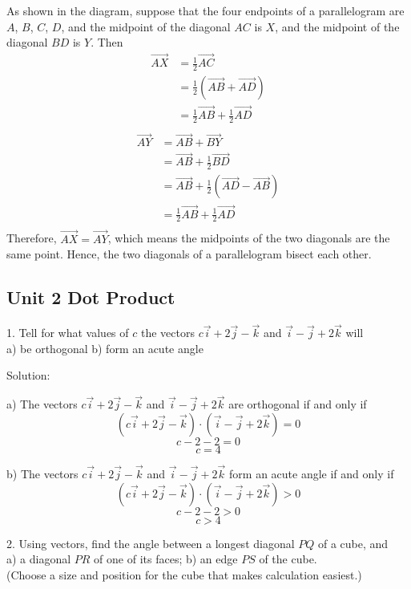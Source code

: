 \documentclass{article}
\begin{document}
As shown in the diagram, suppose that the four endpoints of a parallelogram are 
$A$, $B$, $C$, $D$, and the midpoint of the diagonal $AC$ is $X$, and the 
midpoint of the diagonal $BD$ is $Y$. Then
\[
  \begin{split}
    \vec{AX} &= \frac{1}{2}\vec{AC} \\
             &= \frac{1}{2}(\vec{AB} + \vec{AD}) \\
             &= \frac{1}{2}\vec{AB} + \frac{1}{2}\vec{AD} \\
  \end{split}
\]
\[
  \begin{split}
    \vec{AY} &= \vec{AB} + \vec{BY} \\
             &= \vec{AB} + \frac{1}{2}\vec{BD} \\
             &= \vec{AB} + \frac{1}{2}(\vec{AD} - \vec{AB}) \\
             &= \frac{1}{2}\vec{AB} + \frac{1}{2}\vec{AD} \\
  \end{split}
\]
Therefore, $\vec{AX} = \vec{AY}$, which means the midpoints of the two 
diagonals are the same point. Hence, the two diagonals of a parallelogram 
bisect each other.

\subsection*{Unit 2 Dot Product}

1. Tell for what values of $c$ the vectors $c \vec{i} + 2 \vec{j} - \vec{k}$
and $\vec{i} - \vec{j} + 2 \vec{k}$ will \\
a) be orthogonal \hspace{10px} b) form an acute angle

Solution:

a) The vectors $c \vec{i} + 2 \vec{j} - \vec{k}$ and 
$\vec{i} - \vec{j} + 2 \vec{k}$ are orthogonal if and only if
\[
  (c \vec{i} + 2 \vec{j} - \vec{k}) \cdot (\vec{i} - \vec{j} + 2 \vec{k}) = 0
\]
\[
  c - 2 - 2 = 0
\]
\[
  c = 4
\]

b) The vectors $c \vec{i} + 2 \vec{j} - \vec{k}$ and 
$\vec{i} - \vec{j} + 2 \vec{k}$ form an acute angle if and only if
\[
  (c \vec{i} + 2 \vec{j} - \vec{k}) \cdot (\vec{i} - \vec{j} + 2 \vec{k}) > 0
\]
\[
  c - 2 - 2 > 0
\]
\[
  c > 4
\]

2. Using vectors, find the angle between a longest diagonal $PQ$ of a cube,
and \\
a) a diagonal $PR$ of one of its faces; \hspace{10px} b) an edge $PS$ of the
cube. \\
(Choose a size and position for the cube that makes calculation easiest.)
\end{document}
